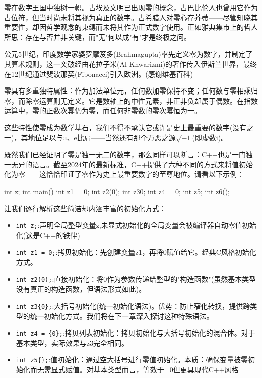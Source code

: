 
零在数字王国中独树一帜。古埃及文明已出现零的概念，古巴比伦人也曾用它作为占位符，但当时尚未将其视为真正的数字。古希腊人对零心存芥蒂——尽管知晓其重要性，却因哲学观念的束缚而未将其作为正式数字使用。正如雅典集市上的哲人所思：存在与否并非关键，而"无"何以成"有"才是终极之问。

公元5世纪，印度数学家婆罗摩笈多(Brahmagupta)率先定义零为数字，并制定了其算术规则，这一突破经由花拉子米(Al-Khwarizmi)的著作传入伊斯兰世界，最终在12世纪通过斐波那契(Fibonacci)引入欧洲。(感谢维基百科)

零具有多重独特属性：作为加法单位元，任何数加零保持不变；任何数与零相乘归零，而除零运算则无定义。它是数轴上的中性元素，非正非负却属于偶数。在指数运算中，零的正数次幂仍为零，而任何非零数的零次幂恒为一。

这些特性使零成为数学基石，我们不得不承认它或许是史上最重要的数字(没有之一)，其地位足以与π、e比肩——当然还有那个万恶之源$\sqrt{-1}$(即虚数i)。

既然我们已经证明了零是独一无二的数字，那么同样可以断言：C++也是一门独一无异的语言。截至2024年的最新标准，C++提供了六种不同的方式来将值初始化为零——这恰恰印证了零作为史上最重要数字的至尊地位。请看以下示例：

\begin{cpp}
int z;
int main()
{
  int z1 = 0;
  int z2(0);
  int z3{0};
  int z4 = {0};
  int z5{};
  int z6();
}
\end{cpp}

让我们逐行解析这些简洁却内涵丰富的初始化方式：

\begin{itemize}
\item 
\verb|int z;|:声明全局整型变量z,未显式初始化的全局变量会被编译器自动零值初始化(这是C++的铁律)

\item 
\verb|int z1 = 0;|:拷贝初始化：先创建变量z1，再将0赋值给它。经典C风格初始化方式。

\item 
\verb|int z2(0);|:直接初始化：将0作为参数传递给整型的"构造函数"(虽然基本类型没有真正的构造函数，但语法形式如此)。

\item 
\verb|int z3{0};|:大括号初始化(统一初始化语法)。优势：防止窄化转换，提供跨类型的统一初始化方式。我们将在下一章深入探讨这种特殊语法。

\item 
\verb|int z4 = {0};|:拷贝列表初始化：拷贝初始化与大括号初始化的混合体。对于基本类型，实际效果与z3完全相同。

\item 
\verb|int z5{};|:值初始化：通过空大括号{}进行零值初始化。本质：确保变量被零初始化而无需显式赋值。对基本类型而言，等效于=0但更具现代C++风格
\end{itemize}

